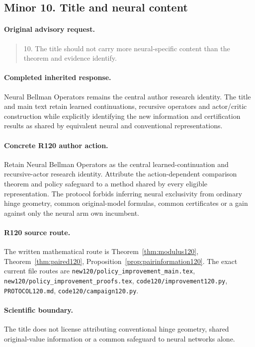 \subsection{Minor 10. Title and neural content}
\label{response120:minor-10}
\paragraph{Original advisory request.}
\begin{quote}
10. The title should not carry more neural-specific content than the theorem and evidence identify.
\end{quote}
\paragraph{Completed inherited response.}
Neural Bellman Operators remains the central author research identity. The title and main text retain learned continuations, recursive operators and actor/critic construction while explicitly identifying the new information and certification results as shared by equivalent neural and conventional representations.
\paragraph{Concrete R120 author action.}
Retain Neural Bellman Operators as the central learned-continuation and recursive-actor research identity. Attribute the action-dependent comparison theorem and policy safeguard to a method shared by every eligible representation. The protocol forbids inferring neural exclusivity from ordinary hinge geometry, common original-model formulas, common certificates or a gain against only the neural arm own incumbent.
\paragraph{R120 source route.}
The written mathematical route is Theorem~\ref{thm:modulus120}, Theorem~\ref{thm:paired120}, Proposition~\ref{prop:pairinformation120}. The exact current file routes are \nolinkurl{new120/policy_improvement_main.tex}, \nolinkurl{new120/policy_improvement_proofs.tex}, \nolinkurl{code120/improvement120.py}, \nolinkurl{PROTOCOL120.md}, \nolinkurl{code120/campaign120.py}.
\paragraph{Scientific boundary.}
The title does not license attributing conventional hinge geometry, shared original-value information or a common safeguard to neural networks alone.
